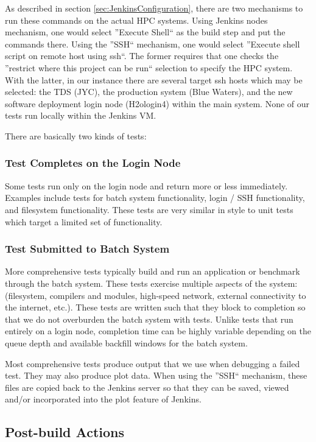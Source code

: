 \documentclass[10pt, conference, compsocconf]{IEEEtran}
\begin{document}
As described in section \ref{sec:JenkinsConfiguration}, there are two mechanisms to run these commands on the actual HPC systems. 
Using Jenkins nodes mechanism, one would select ''Execute Shell`` as the build step and put the commands there. Using the ''SSH`` mechanism, one would select ''Execute shell script on remote host using ssh``. 
The former requires that one checks the ''restrict where this project can be run`` selection to specify the HPC system. 
With the latter, in our instance there are several target ssh hosts which may be selected: the TDS (JYC), the production system (Blue Waters), and the new software deployment login node (H2ologin4) within the main system. 
None of our tests run locally within the Jenkins VM.

There are basically two kinds of tests: 

\subsubsection{Test Completes on the Login Node}
Some tests run only on the login node and return more or less immediately. 
Examples include tests for batch system functionality, login / SSH functionality, and filesystem functionality. 
These tests are very similar in style to unit tests which target a limited set of functionality.

\subsubsection{Test Submitted to Batch System}
More comprehensive tests typically build and run an application or benchmark through the batch system.  
These tests exercise multiple aspects of the system: (filesystem, compilers and modules, high-speed network, external connectivity to the internet, etc.). 
These tests are written such that they block to completion so that we do not overburden the batch system with tests. 
Unlike tests that run entirely on a login node, completion time can be highly variable depending on the queue depth and available backfill windows for the batch system.
 

Most comprehensive tests produce output that we use when debugging a failed test. 
They may also produce plot data. When using the ''SSH`` mechanism, these files are copied back to the Jenkins server so that they can be saved, viewed and/or incorporated into the plot feature of Jenkins. 
 
\subsection{Post-build Actions}
\end{document}

